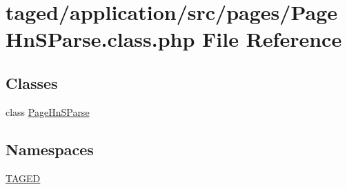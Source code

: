 \hypertarget{_page_hn_s_parse_8class_8php}{}\section{taged/application/src/pages/\+Page\+Hn\+S\+Parse.class.\+php File Reference}
\label{_page_hn_s_parse_8class_8php}
\subsection*{Classes}
\begin{DoxyCompactItemize}
\item 
class \hyperlink{class_page_hn_s_parse}{Page\+Hn\+S\+Parse}
\end{DoxyCompactItemize}
\subsection*{Namespaces}
\begin{DoxyCompactItemize}
\item 
 \hyperlink{namespace_t_a_g_e_d}{T\+A\+G\+ED}
\end{DoxyCompactItemize}
